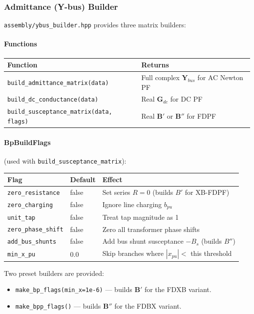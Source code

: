 \subsubsection{Admittance (Y-bus) Builder}
\label{sec:ybus-builder}

\texttt{assembly/ybus\_builder.hpp} provides three matrix builders:

\paragraph{Functions}
\begin{center}
\begin{tabular}{ll}
\hline\hline
\textbf{Function} & \textbf{Returns} \\
\hline
\texttt{build\_admittance\_matrix(data)} & Full complex \(\mathbf{Y}_{bus}\) for AC Newton PF \\
\texttt{build\_dc\_conductance(data)} & Real \(\mathbf{G}_{dc}\) for DC PF \\
\texttt{build\_susceptance\_matrix(data, flags)} & Real \(\mathbf{B}'\) or \(\mathbf{B}''\) for FDPF \\
\hline\hline
\end{tabular}
\end{center}

\paragraph{BpBuildFlags} (used with \texttt{build\_susceptance\_matrix}):
\begin{longtable}{lll}
\hline\hline
\textbf{Flag} & \textbf{Default} & \textbf{Effect} \\
\hline\endhead\hline\endfoot
\texttt{zero\_resistance} & false & Set series $R=0$ (builds $B'$ for XB-FDPF) \\
\texttt{zero\_charging} & false & Ignore line charging $b_{pu}$ \\
\texttt{unit\_tap} & false & Treat tap magnitude as 1 \\
\texttt{zero\_phase\_shift} & false & Zero all transformer phase shifts \\
\texttt{add\_bus\_shunts} & false & Add bus shunt susceptance $-B_s$ (builds $B''$) \\
\texttt{min\_x\_pu} & 0.0 & Skip branches where $|x_{pu}| <$ this threshold \\
\end{longtable}

Two preset builders are provided:
\begin{itemize}
  \item \texttt{make\_bp\_flags(min\_x=1e-6)} --- builds $\mathbf{B}'$ for the FDXB variant.
  \item \texttt{make\_bpp\_flags()} --- builds $\mathbf{B}''$ for the FDBX variant.
\end{itemize}

